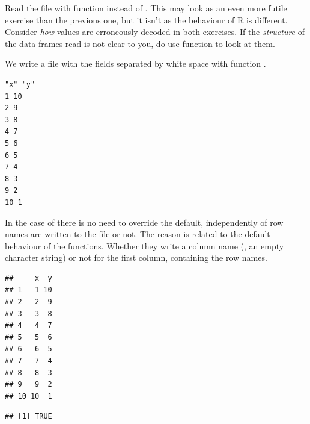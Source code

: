 \documentclass[krantz2]{krantz}\usepackage{knitr}%
\begin{document}
\begin{playground}
Read the file with function  instead of . This may look as an even more futile exercise than the previous one, but it isn't as the behaviour of R is different. Consider \emph{how} values are erroneously decoded in both exercises. If the \emph{structure} of the data frames read is not clear to you, do use function  to look at them.
\end{playground}

We write a file with the fields separated by white space with function .
\begin{knitrout}\footnotesize
{}\color{fgcolor}\begin{kframe}
\begin{alltt}
  \hlstd{=} \hlstd{,}  \hlstd{=} \hlstd{)}
\hlstd{(}\hlstd{,}  \hlstd{=} \hlstd{)}
\end{alltt}
\end{kframe}
\end{knitrout}

\begin{knitrout}\footnotesize
{}\color{fgcolor}\begin{kframe}
\begin{verbatim}
"x" "y"
1 10
2 9
3 8
4 7
5 6
6 5
7 4
8 3
9 2
10 1
\end{verbatim}
\end{kframe}
\end{knitrout}

In the case of  there is no need to override the default, independently of row names are written to the file or not. The reason is related to the default behaviour of the  functions. Whether they write a column name (, an empty character string) or not for the first column, containing the row names.
\begin{knitrout}\footnotesize
{}\color{fgcolor}\begin{kframe}
\begin{alltt}
 \hlkwb{<-} \hlstd{(} \hlstd{=} \hlstd{,}  \hlstd{=} \hlstd{)}
\end{alltt}
\begin{verbatim}
##     x  y
## 1   1 10
## 2   2  9
## 3   3  8
## 4   4  7
## 5   5  6
## 6   6  5
## 7   7  4
## 8   8  3
## 9   9  2
## 10 10  1
\end{verbatim}
\begin{alltt}
  \hlstd{=} \hlstd{)}
\end{alltt}
\begin{verbatim}
## [1] TRUE
\end{verbatim}
\end{kframe}
\end{knitrout}
\end{document}
